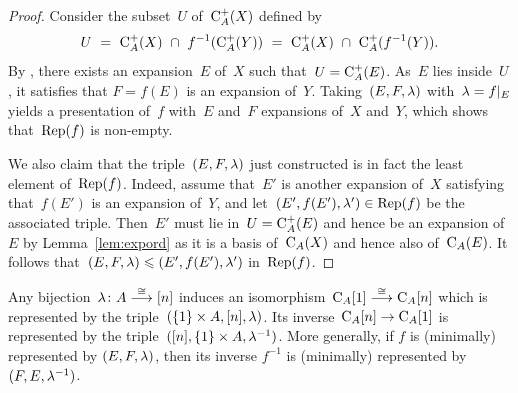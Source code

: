 \begin{proof}
Consider the subset~$U$ of~$\mathrm{C}_A^+(X)$ defined by 
\begin{align*}U \ =\ \rmC_A^+(X)\ \cap\ f^{-1}(\rmC_A^+(Y)) %
\ =\ \rmC_A^+(X)\ \cap\ \rmC_A^+(f^{-1}(Y)). %
\end{align*}
By \cite[Lem.~2.4]{Higman}, there exists an expansion~$E$ of~$X$ such that~$U=\mathrm{C}_A^+(E)$. As~$E$ lies inside~$U$, it satisfies that %
$F=f(E)$ is an expansion of~$Y$. %
Taking~$(E,F,\lambda)$ with~$\lambda=f|_{E}$ yields a presentation of~$f$ with~$E$ and~$F$ expansions of~$X$ and~$Y$, which shows that~$\operatorname{Rep}(f)$ is non-empty. 

We also claim that the triple~$(E,F,\lambda)$ just constructed is in fact the least element of~$\operatorname{Rep}(f)$. Indeed, assume that~$E'$ is another expansion of~$X$ satisfying that~$f(E')$ 
 is an expansion of~$Y$, and let~$(E',f(E'),\lambda')\in \operatorname{Rep}(f)$ be the associated triple. 
Then~$E'$ must lie in~$U=\mathrm{C}_A^+(E)$ and hence be an expansion of~$E$ by Lemma~\ref{lem:expord} as it is a basis of~$\mathrm{C}_A(X)$ and hence also of~$\mathrm{C}_A(E)$. 
It follows that~\hbox{$(E,F,\lambda)\leqslant (E',f(E'),\lambda')$} in~$\operatorname{Rep}(f)$. 
\end{proof}

\begin{ex}\label{ex:iso}
Any bijection~$\lambda\colon A\stackrel{\cong}{\longrightarrow} [n]$ induces an isomorphism~$\mathrm{C}_A[1]\stackrel{\cong}{\longrightarrow} \mathrm{C}_A[n]$ which is represented by the triple~$(\{1\}\times A,[n],\lambda)$. Its inverse~$\mathrm{C}_A[n]\to \mathrm{C}_A[1]$ is represented by the triple~$([n],\{1\}\times A,\lambda^{-1})$. More generally,  if $f$ is (minimally) represented by $(E,F,\lambda)$, then its inverse $f^{-1}$ is (minimally) represented by~$(F,E,\lambda^{-1})$. 
\end{ex}


